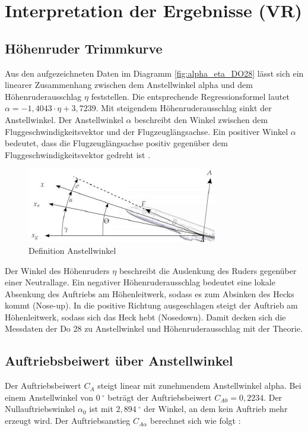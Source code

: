 \chapter{Interpretation der Ergebnisse (VR)}

\section{Höhenruder Trimmkurve}

Aus den aufgezeichneten Daten im Diagramm \ref{fig:alpha_eta_DO28} lässt sich ein linearer Zusammenhang zwischen dem Anstellwinkel alpha und dem 
Höhenruderausschlag $\eta$ feststellen. Die entsprechende Regressionsformel lautet $\alpha = -1,4043 \cdot \eta + 3,7239$. Mit steigendem Höhenruderausschlag sinkt der Anstellwinkel. 
Der Anstellwinkel $\alpha$ beschreibt den Winkel zwischen dem Fluggeschwindigkeitsvektor und der Flugzeuglängsachse. Ein positiver Winkel $\alpha$ bedeutet, dass die Flugzeuglängsachse positiv gegenüber dem Fluggeschwindigkeitsvektor gedreht ist \cite{Skript}. 

\begin{figure}[h]
		\includegraphics{./Bilder/Anstellwinkel_Definition.jpg}
	\caption{Definition Anstellwinkel}
	\label{alpha_def}
\end{figure}

Der Winkel des Höhenruders $\eta$ beschreibt die Auslenkung des Ruders gegenüber einer Neutrallage. Ein negativer 
Höhenruderausschlag bedeutet eine lokale Absenkung des Auftriebs am Höhenleitwerk, sodass es zum Absinken des Hecks kommt (Nose-up). In die positive Richtung ausgeschlagen steigt der Auftrieb am Höhenleitwerk, sodass sich das Heck hebt (Nosedown). 
Damit decken sich die Messdaten der Do 28 zu Anstellwinkel und Höhenruderausschlag mit der Theorie.




\section{Auftriebsbeiwert über Anstellwinkel}

Der Auftriebsbeiwert $C_A$ steigt linear mit zunehmendem Anstellwinkel alpha. Bei einem Anstellwinkel von $0 \ ^{\circ}$ beträgt der Auftriebsbeiwert $C_{A0}=0,2234$. Der Nullauftriebswinkel $\alpha_{0}$ ist mit $2,894 \ ^{\circ}$ der Winkel, an dem kein Auftrieb mehr erzeugt wird. Der Auftriebsanstieg $C_{A\alpha}$ berechnet sich wie folgt \cite{Skript}:


